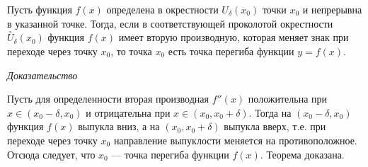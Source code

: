 Пусть функция $f(x)$ определена в окрестности $U_\delta(x_0)$ точки $x_0$ и непрерывна в указанной точке. Тогда, если в соответствующей проколотой окрестности $\overset{\circ}U_\delta(x_0)$ функция $f(x)$ имеет вторую производную, которая меняет знак при переходе через точку $x_0$, то точка $x_0$ есть точка перегиба функции $y = f(x)$.

\textit{Доказательство}

Пусть для определенности вторая производная $f
''(x)$ положительна при $x \in (x_0 - \delta, x_0)$ и отрицательна при $x \in (x_0, x_0 + \delta)$. Тогда на $(x_0 −\delta, x_0)$ функция $f(x)$ выпукла вниз, а на $(x_0, x_0 + \delta)$ выпукла вверх, т.е. при переходе через точку $x_0$ направление выпуклости меняется на противоположное. Отсюда следует, что $x_0$ — точка перегиба функции $f(x)$. Теорема доказана.


    